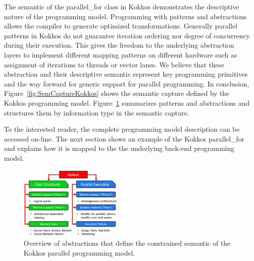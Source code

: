 The semantic of the parallel\_for class in Kokkos demonstrates the descriptive nature of the programming model. Programming with patterns and abstractions allows the compiler to generate optimized transformations. 
Generally parallel patterns in Kokkos do not guarantee iteration ordering nor degree of concurrency during their execution. This gives the freedom to the underlying abstraction layers to implement different mapping patterns on different hardware such as assignment of iterations to threads or vector lanes. We believe that these abstraction and their descriptive semantic represent key programming primitives and the way forward for generic support for parallel programming. In conclusion, Figure~\ref{fig:SemCaptureKokkos} shows the semantic capture defined by the Kokkos programming model. Figure~\ref{fig:abstractions} summarizes patterns and abstractions and structures them by information type in the semantic capture.

To the interested reader, the complete programming model description can be accessed on-line\cite{KOKKOS_WIKI}.
The next section shows an example of the Kokkos parallel\_for and explains how it is mapped to the the underlying back-end programming model.

\begin{figure}
\centerline{\includegraphics[width=0.45\textwidth]{img/Abstractions.png}}
\caption{Overview of abstractions that define the constrained semantic of the Kokkos parallel programming model.}
\label{fig:abstractions}
\end{figure}
